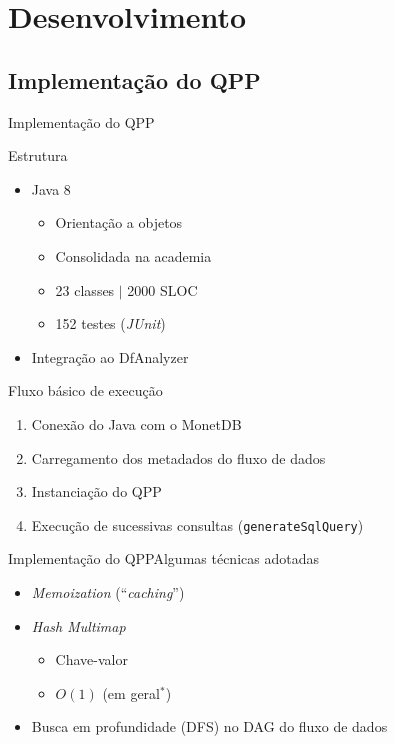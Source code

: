 \documentclass[12pt,compress,final]{beamer}
\newcommand{\nologo}{\setbeamertemplate{logo}{}} %
\begin{document}

\section{Desenvolvimento}
\subsection*{Implementação do QPP}

{\nologo
\begin{frame}[t,squeeze]{Implementação do QPP}
\vspace{-.5cm}
\small

\begin{block}{Estrutura}
\begin{itemize}
\item Java 8
\begin{itemize}
\item Orientação a objetos
\item Consolidada na academia
\item 23 classes $\mid$ 2000 SLOC
\item 152 testes (\textit{JUnit})
\end{itemize}
\item Integração ao DfAnalyzer
\end{itemize}
\end{block}

\begin{exampleblock}{Fluxo básico de execução}
\begin{enumerate}
\item Conexão do Java com o MonetDB
\item Carregamento dos metadados do fluxo de dados
\item Instanciação do QPP
\item Execução de sucessivas \alert{consultas} (\texttt{generateSqlQuery})
\end{enumerate}
\end{exampleblock}
\end{frame}
}


\begin{frame}{Implementação do QPP}{Algumas técnicas adotadas}

\begin{itemize}
\item \textit{Memoization} (``\textit{caching}'')
\vfill
\item \textit{Hash Multimap}
\begin{itemize}
\item Chave-valor
\item $O(1)$ (em geral${}^{\ast}$)
\end{itemize}
\vfill
\item Busca em profundidade (DFS) no DAG do fluxo de dados
\vfill
\end{itemize}

\end{frame}
\end{document}
